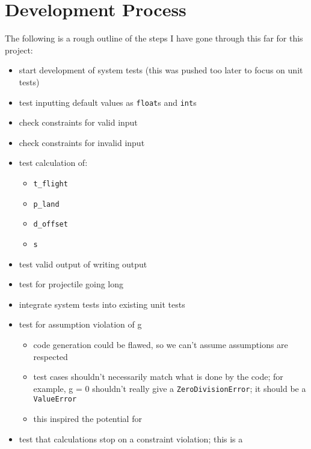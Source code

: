 \chapter{Development Process}
\label{chap:dev-proc}

The following is a rough outline of the steps I have gone through this far for
this project:

\begin{itemize}
      \item start development of system tests (this was pushed too later to focus
            on unit tests)
      \item test inputting default values as \texttt{float}s and \texttt{int}s
      \item check constraints for valid input
      \item check constraints for invalid input
      \item test calculation of:
            \begin{itemize}
                  \item \texttt{t\_flight}
                  \item \texttt{p\_land}
                  \item \texttt{d\_offset}
                  \item \texttt{s}
            \end{itemize}
      \item test valid output of writing output
      \item test for projectile going long
      \item integrate system tests into existing unit tests
      \item test for assumption violation of g
            \begin{itemize}
                  \item code generation could be flawed, so we can't assume
                        assumptions are respected
                  \item test cases shouldn't necessarily match what is done by the
                        code; for example, g = 0 shouldn't really give a
                        \texttt{ZeroDivisionError}; it should be a \texttt{ValueError}
                  \item this inspired the potential for
            \end{itemize}
      \item test that calculations stop on a constraint violation; this is a

\end{itemize}
